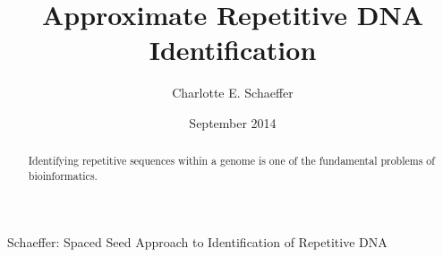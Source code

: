 \title{Approximate Repetitive DNA Identification}
\author{Charlotte E. Schaeffer}
\date{September 2014}
{Schaeffer: Spaced Seed Approach to Identification of Repetitive DNA}
\maketitle

\begin{abstract}
Identifying repetitive sequences within a genome is one of the fundamental problems of bioinformatics.  
\end{abstract}

\tableofcontents
\newpage
